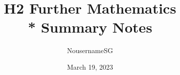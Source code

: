 
\title{H2 Further Mathematics \\* Summary Notes}
\author{NousernameSG}
\date{March 19, 2023}



\maketitle

\newpage \ \newpage \ \newpage

{\onecolumn \setcounter{tocdepth}{2} \tableofcontents} \newpage
\twocolumn

 \newpage
 \newpage
 \newpage
 \newpage
 \newpage
 \newpage
 \newpage


